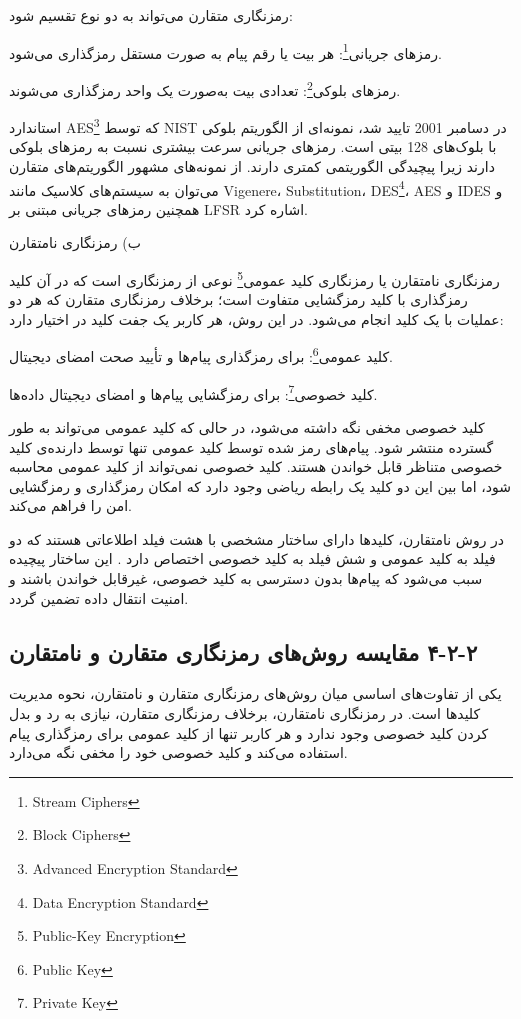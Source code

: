 رمزنگاری متقارن می‌تواند به دو نوع تقسیم شود:

رمزهای جریانی\footnote{Stream Ciphers}: هر بیت یا رقم پیام به صورت مستقل رمزگذاری می‌شود.

رمزهای بلوکی\footnote{Block Ciphers}: تعدادی بیت به‌صورت یک واحد رمزگذاری می‌شوند.

استاندارد AES\footnote{Advanced Encryption Standard} که توسط NIST در دسامبر 2001 تایید شد، نمونه‌ای از الگوریتم بلوکی با بلوک‌های 128 بیتی است. رمزهای جریانی سرعت بیشتری نسبت به رمزهای بلوکی دارند زیرا پیچیدگی الگوریتمی کمتری دارند. از نمونه‌های مشهور الگوریتم‌های متقارن می‌توان به سیستم‌های کلاسیک مانند Vigenere، Substitution، DES\footnote{Data Encryption Standard}، AES و IDES و همچنین رمزهای جریانی مبتنی بر LFSR اشاره کرد\cite{ref25, ref27}.

ب) رمزنگاری نامتقارن

رمزنگاری نامتقارن یا رمزنگاری کلید عمومی\footnote{Public-Key Encryption} نوعی از رمزنگاری است که در آن کلید رمزگذاری با کلید رمزگشایی متفاوت است؛ برخلاف رمزنگاری متقارن که هر دو عملیات با یک کلید انجام می‌شود. در این روش، هر کاربر یک جفت کلید در اختیار دارد:

کلید عمومی\footnote{Public Key}: برای رمزگذاری پیام‌ها و تأیید صحت امضای دیجیتال.

کلید خصوصی\footnote{Private Key}: برای رمزگشایی پیام‌ها و امضای دیجیتال داده‌ها.

کلید خصوصی مخفی نگه داشته می‌شود، در حالی که کلید عمومی می‌تواند به طور گسترده منتشر شود. پیام‌های رمز شده توسط کلید عمومی تنها توسط دارنده‌ی کلید خصوصی متناظر قابل خواندن هستند. کلید خصوصی نمی‌تواند از کلید عمومی محاسبه شود، اما بین این دو کلید یک رابطه ریاضی وجود دارد که امکان رمزگذاری و رمزگشایی امن را فراهم می‌کند.

در روش نامتقارن، کلیدها دارای ساختار مشخصی با هشت فیلد اطلاعاتی هستند که دو فیلد به کلید عمومی و شش فیلد به کلید خصوصی اختصاص دارد \cite{ref28}.  این ساختار پیچیده سبب می‌شود که پیام‌ها بدون دسترسی به کلید خصوصی، غیرقابل خواندن باشند و امنیت انتقال داده تضمین گردد.

\subsection{‏۲‏-‏۲‏-‏۴‏ مقایسه روش‌های رمزنگاری متقارن و نامتقارن}

یکی از تفاوت‌های اساسی میان روش‌های رمزنگاری متقارن و نامتقارن، نحوه مدیریت کلیدها است. در رمزنگاری نامتقارن، برخلاف رمزنگاری متقارن، نیازی به رد و بدل کردن کلید خصوصی وجود ندارد و هر کاربر تنها از کلید عمومی برای رمزگذاری پیام استفاده می‌کند و کلید خصوصی خود را مخفی نگه می‌دارد.

